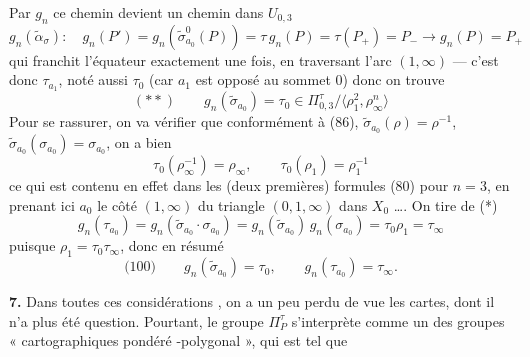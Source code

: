 \documentclass[11pt,a4paper]{article}
\begin{document}
Par $g_n$ ce chemin devient un chemin dans $U_{0,3}$
\[
  g_n(\tilde\alpha_\sigma) : \quad g_n(P') = g_n(\tilde\sigma_{a_0}^0(P)) = \tau\, g_n(P) = \tau(P_+) = P_- \longrightarrow g_n(P) = P_+
\]
qui franchit l'équateur \struck{\ill{}} exactement une fois, en traversant l'arc $(1,\infty)$ — c'est donc $\tau_{a_1}$, noté aussi $\tau_0$ (car $a_1$ est opposé au sommet $0$) donc on trouve
\[
  (**)\qquad g_n(\tilde\sigma_{a_0}) = \tau_0 \in \Pi_{0,3}^\tau/\langle \rho_1^2, \rho_\infty^n \rangle
\]
Pour se rassurer, on va vérifier que conformément à (86), $\tilde\sigma_{a_0}(\rho) = \rho^{-1}$, $\tilde\sigma_{a_0}(\sigma_{a_0}) = \sigma_{a_0}$, on a bien
\[
  \tau_0(\rho_\infty^{-1}) = \rho_\infty, \qquad \tau_0(\rho_1) = \rho_1^{-1}
\]
ce qui est contenu en effet dans les \ill{} (deux premières) formules (80) pour $n=3$, en prenant ici \struck{\ill{}} $a_0$ le côté $(1,\infty)$ du triangle $(0,1,\infty)$ dans $X_0$ …. On tire de \struck{\ill{}} (*)
\[
  g_n(\tau_{a_0}) = g_n(\tilde\sigma_{a_0} \cdot \sigma_{a_0}) = g_n(\tilde\sigma_{a_0})\, g_n(\sigma_{a_0}) = \tau_0 \rho_1 = \tau_\infty
\]
puisque $\rho_1 = \tau_0 \tau_\infty$, donc en résumé
\[
  \text{(100)}\qquad g_n(\tilde\sigma_{a_0}) = \tau_0, \qquad g_n(\tau_{a_0}) = \tau_\infty .
\]

\textbf{7.} Dans toutes ces considérations , on a un peu perdu de vue les cartes, dont il n'a plus été question. Pourtant, le groupe $\Pi_P^\tau$ s'interprète comme un des groupes « cartographiques pondéré \struck{\ill{}}-polygonal », qui est tel que
\end{document}
